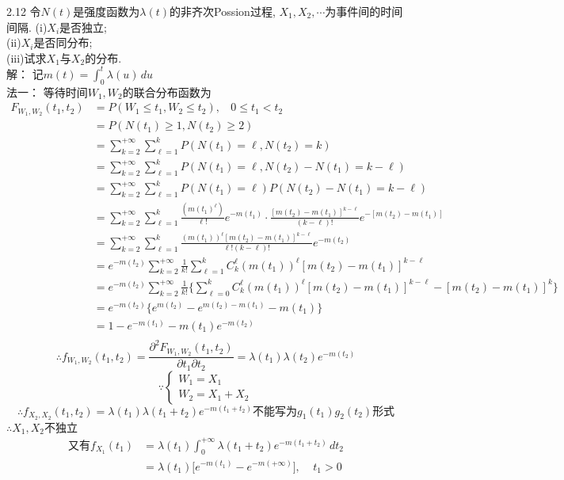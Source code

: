2.12 令$N(t)$是强度函数为$\lambda (t)$的非齐次Possion过程, $X_1, X_2, \cdots$为事件间的时间间隔.
(i)$X_i$是否独立;\\
(ii)$X_i$是否同分布;\\
(iii)试求$X_1$与$X_2$的分布.\\
解：
记$m(t) = \int^t_0\lambda(u)\,du$\\
法一：
等待时间$W_1,W_2$的联合分布函数为
\[
\begin{split}
F_{W_1,W_2}(t_1,t_2) & = P(W_1 \leqslant t_1, W_2 \leqslant t_2),~~~~0 \leqslant t_1 < t_2\\
					& = P(N(t_1) \geqslant 1, N(t_2) \geqslant 2)\\
					& = \sum^{+\infty}_{k=2}\sum^k_{\ell=1}P(N(t_1) = \ell, N(t_2) = k)\\
					& = \sum^{+\infty}_{k=2}\sum^k_{\ell=1}P(N(t_1) = \ell, N(t_2) - N(t_1) = k - \ell)\\
					& = \sum^{+\infty}_{k=2}\sum^k_{\ell=1}P(N(t_1) = \ell)P(N(t_2) - N(t_1) = k - \ell)\\
					& = \sum^{+\infty}_{k=2}\sum^k_{\ell=1}\frac{(m(t_1)^\ell)}{\ell !}e^{-m(t_1)}\cdot \frac{[m(t_2)-m(t_1)]^{k-\ell}}{(k-\ell)!}e^{-[m(t_2)-m(t_1)]}\\
					& = \sum^{+\infty}_{k=2}\sum^k_{\ell=1}\frac{(m(t_1))^\ell[m(t_2)-m(t_1)]^{k-\ell}}{\ell !(k-\ell)!}e^{-m(t_2)}\\
					& = e^{-m(t_2)}\sum^{+\infty}_{k=2}\frac{1}{k!}\sum^k_{\ell=1}C^\ell_k(m(t_1))^\ell[m(t_2)-m(t_1)]^{k-\ell}\\
					& = e^{-m(t_2)}\sum^{+\infty}_{k=2}\frac{1}{k!}\bigg\{\sum^k_{\ell=0}C^\ell_k(m(t_1))^\ell[m(t_2)-m(t_1)]^{k-\ell}-[m(t_2)-m(t_1)]^k\bigg\}\\
					& = e^{-m(t_2)}\Big\{e^{m(t_2)}-e^{m(t_2)-m(t_1)}-m(t_1)\Big\}\\
					& = 1-e^{-m(t_1)}-m(t_1)e^{-m(t_2)}\\
\end{split}
\]
\[
\therefore f_{W_1,W_2}(t_1,t_2) = \frac{\partial^2F_{W_1,W_2}(t_1,t_2)}{\partial t_1\partial t_2} = \lambda(t_1)\lambda(t_2)e^{-m(t_2)}
\]
\[
\because
\begin{cases}
W_1 = X_1\\
W_2 = X_1 + X_2
\end{cases}
\]
\[
\therefore f_{X_2,X_2}(t_1,t_2) = \lambda(t_1)\lambda(t_1+t_2)e^{-m(t_1+t_2)}\text{不能写为}g_1(t_1)g_2(t_2)\text{形式}
\]
$\therefore X_1, X_2$不独立\\
\[
\begin{split}
\text{又有} f_{X_1}(t_1) & = \lambda(t_1)\int^{+\infty}_0\lambda(t_1+t_2)e^{-m(t_1+t_2)}\,dt_2\\
						& = \lambda(t_1)\Big[e^{-m(t_1)}-e^{-m(+\infty)}\Big],~~~~~t_1> 0\\
\end{split}
\]
